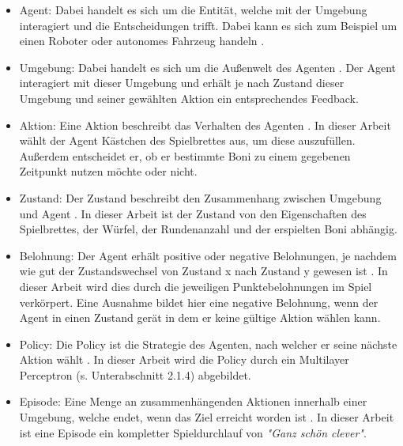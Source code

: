 \begin{itemize}
\item Agent: Dabei handelt es sich um die Entität, welche mit der Umgebung interagiert und die Entscheidungen trifft. Dabei kann es sich zum Beispiel um einen Roboter oder autonomes Fahrzeug handeln \cite[S. 11]{ris-ala_fundamentals_2023}.

\item Umgebung: Dabei handelt es sich um die Außenwelt des Agenten \cite[S. 11]{ris-ala_fundamentals_2023}. Der Agent interagiert mit dieser Umgebung und erhält je nach Zustand dieser Umgebung und seiner gewählten Aktion ein entsprechendes Feedback.

\item Aktion: Eine Aktion beschreibt das Verhalten des Agenten \cite[S. 11]{ris-ala_fundamentals_2023}. In dieser Arbeit wählt der Agent Kästchen des Spielbrettes aus, um diese auszufüllen. Außerdem entscheidet er, ob er bestimmte Boni zu einem gegebenen Zeitpunkt nutzen möchte oder nicht.

\item Zustand: Der Zustand beschreibt den Zusammenhang zwischen Umgebung und Agent \cite[S. 11]{ris-ala_fundamentals_2023}. In dieser Arbeit ist der Zustand von den Eigenschaften des Spielbrettes, der Würfel, der Rundenanzahl und der erspielten Boni abhängig.

\item Belohnung: Der Agent erhält positive oder negative Belohnungen, je nachdem wie gut der Zustandswechsel von Zustand x nach Zustand y gewesen ist \cite[S. 11]{ris-ala_fundamentals_2023}. In dieser Arbeit wird dies durch die jeweiligen Punktebelohnungen im Spiel verkörpert. Eine Ausnahme bildet hier eine negative Belohnung, wenn der Agent in einen Zustand gerät in dem er keine gültige Aktion wählen kann.

\item Policy: Die Policy ist die Strategie des Agenten, nach welcher er seine nächste Aktion wählt \cite[S. 11]{ris-ala_fundamentals_2023}. In dieser Arbeit wird die Policy durch ein Multilayer Perceptron (s. Unterabschnitt 2.1.4) abgebildet.

\item Episode: Eine Menge an zusammenhängenden Aktionen innerhalb einer Umgebung, welche endet, wenn das Ziel erreicht worden ist \cite[S. 11]{ris-ala_fundamentals_2023}. In dieser Arbeit ist eine Episode ein kompletter Spieldurchlauf von \textit{"Ganz schön clever"}.
\end{itemize}


